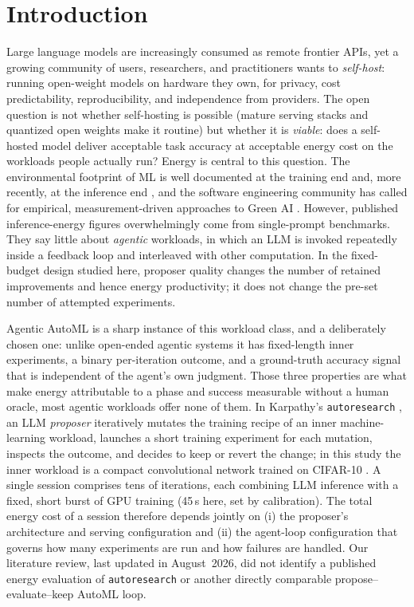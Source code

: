 \section{Introduction}

Large language models are increasingly consumed as remote frontier APIs, yet a growing community of users, researchers, and practitioners wants to \emph{self-host}: running open-weight models on hardware they own, for privacy, cost predictability, reproducibility, and independence from providers. The open question is not whether self-hosting is possible (mature serving stacks and quantized open weights make it routine) but whether it is \emph{viable}: does a self-hosted model deliver acceptable task accuracy at acceptable energy cost on the workloads people actually run? Energy is central to this question. The environmental footprint of ML is well documented at the training end \cite{schwartz2020green} and, more recently, at the inference end \cite{luccioni2024power}, and the software engineering community has called for empirical, measurement-driven approaches to Green AI \cite{cruz2024innovating}. However, published inference-energy figures overwhelmingly come from single-prompt benchmarks. They say little about \emph{agentic} workloads, in which an LLM is invoked repeatedly inside a feedback loop and interleaved with other computation. In the fixed-budget design studied here, proposer quality changes the number of retained improvements and hence energy productivity; it does not change the pre-set number of attempted experiments.

Agentic AutoML is a sharp instance of this workload class, and a deliberately chosen one: unlike open-ended agentic systems it has fixed-length inner experiments, a binary per-iteration outcome, and a ground-truth accuracy signal that is independent of the agent's own judgment. Those three properties are what make energy attributable to a phase and success measurable without a human oracle, most agentic workloads offer none of them. In Karpathy's \texttt{autoresearch} \cite{karpathy2026autoresearch}, an LLM \emph{proposer} iteratively mutates the training recipe of an inner machine-learning workload, launches a short training experiment for each mutation, inspects the outcome, and decides to keep or revert the change; in this study the inner workload is a compact convolutional network trained on CIFAR-10 \cite{krizhevsky2009cifar}. A single session comprises tens of iterations, each combining LLM inference with a fixed, short burst of GPU training (45\,s here, set by calibration). The total energy cost of a session therefore depends jointly on (i) the proposer's architecture and serving configuration and (ii) the agent-loop configuration that governs how many experiments are run and how failures are handled. Our literature review, last updated in August~2026, did not identify a published energy evaluation of \texttt{autoresearch} or another directly comparable propose--evaluate--keep AutoML loop.

